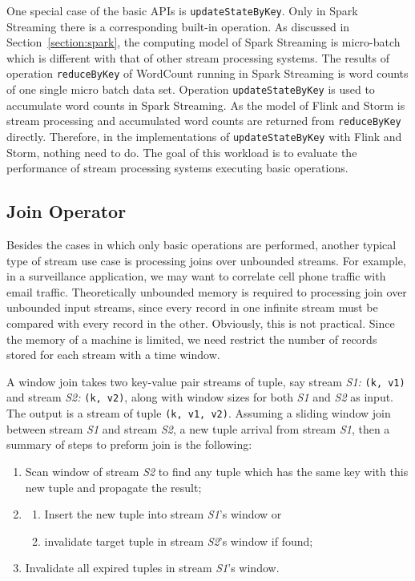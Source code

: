 One special case of the basic APIs is \texttt{updateStateByKey}. Only in Spark Streaming there is a corresponding built-in operation. As discussed in Section~\ref{section:spark}, the computing model of Spark Streaming is micro-batch which is different with that of other stream processing systems. The results of operation \texttt{reduceByKey} of WordCount running in Spark Streaming is word counts of one single micro batch data set. Operation \texttt{updateStateByKey} is used to accumulate word counts in Spark Streaming. As the model of Flink and Storm is stream processing and accumulated word counts are returned from \texttt{reduceByKey} directly. Therefore, in the implementations of \texttt{updateStateByKey} with Flink and Storm, nothing need to do. The goal of this workload is to evaluate the performance of stream processing systems executing basic operations.  


\subsection{Join Operator}
 \label{sub:join_operator}

Besides the cases in which only basic operations are performed, another typical type of stream use case is processing joins over unbounded streams. For example, in a surveillance application, we may want to correlate cell phone traffic with email traffic. Theoretically unbounded memory is required to processing join over unbounded input streams, since every record in one infinite stream must be compared with every record in the other. Obviously, this is not practical. \cite{window-join} Since the memory of a machine is limited, we need restrict the number of records stored for each stream with a time window. 

A window join takes two key-value pair streams of tuple, say stream \textit{S1:} \texttt{(k, v1)} and stream \textit{S2:} \texttt{(k, v2)}, along with window sizes for both \textit{S1} and \textit{S2} as input. The output is a stream of tuple \texttt{(k, v1, v2)}. Assuming a sliding window join between stream \textit{S1} and stream \textit{S2}, a new tuple arrival from stream \textit{S1}, then a summary of steps to preform join is the following:

\begin{enumerate}
\item Scan window of stream \textit{S2} to find any tuple which has the same key with this new tuple and propagate the result;
\item 
\begin{enumerate}
\item Insert the new tuple into stream \textit{S1}'s window or
\item  invalidate target tuple in stream \textit{S2}'s window if found;
\end{enumerate}
\item Invalidate all expired tuples in stream \textit{S1}'s window.
\end{enumerate}

